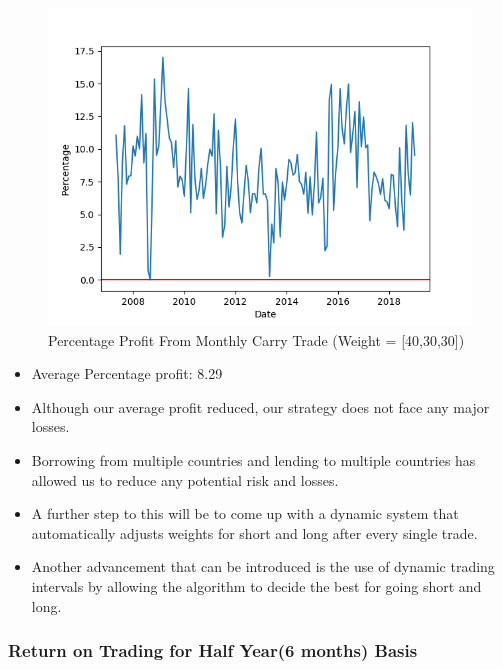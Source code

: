 \documentclass{article}
\begin{document}
\begin{figure}[H]
    \centering
    \includegraphics[scale=.75]{images/carryTrade/monthly2.png}
    \caption{Percentage Profit From Monthly Carry Trade (Weight = [40,30,30])}
    \label{simulationfigure}
\end{figure}

\begin{itemize}
  \item Average Percentage profit: 8.29
  \item Although our average profit reduced, our strategy does not face any major losses.
  \item Borrowing from multiple countries and lending to multiple countries has allowed us to reduce any potential risk and losses.
  \item A further step to this will be to come up with a dynamic system that automatically adjusts weights for short and long after every single trade.
  \item Another advancement that can be introduced is the use of dynamic trading intervals by allowing the algorithm to decide the best for going short and long.
\end{itemize}

\subsubsection{Return on Trading for Half Year(6 months) Basis}

\vspace*{-6.8mm}
\end{document}
